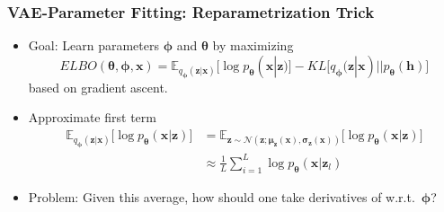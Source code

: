 \documentclass[11pt,mathserif]{beamer}
\renewcommand{\vec}[1]{{\boldsymbol{ #1}}}
\begin{document}
 \begin{frame}
\frametitle{VAE-Parameter Fitting: Reparametrization Trick}
\begin{itemize}
\item Goal: Learn parameters $\vec \phi$ and $\vec \theta$ by maximizing %
\begin{equation*}
ELBO(\vec \theta, \vec \phi, \vec x) = \mathbb{E}_{q_{\vec \phi}(\vec z|\vec x)}\big[ \log p_{\vec \theta}(\vec x|\vec z) \big] - KL\big[ q_{\vec \phi}(\vec z|\vec x) ||  p_{\vec \theta}(\vec h) \big]
\end{equation*}
based on gradient ascent.
\item Approximate first term 
\begin{align*}
\mathbb{E}_{q_{\vec \phi}(\vec z|\vec x)}\big[ \log p_{\vec \theta}(\vec x|\vec z) \big] &= \mathbb{E}_{\vec z \sim \mathcal{N}(\vec z; \vec \mu_{\vec z}(\vec x), \vec \sigma_{\vec z}(\vec x))}\big[ \log p_{\vec \theta}(\vec x|\vec z) \big]\\
&\approx \frac{1}{L} \sum_{i=1}^{L} \log p_{\vec \theta}(\vec x|\vec z_l) 
\end{align*}
\item  Problem: 
Given this average, 
how should one take derivatives of 
w.r.t.~$\vec \phi$?
\end{itemize}

\end{frame}
\end{document}
